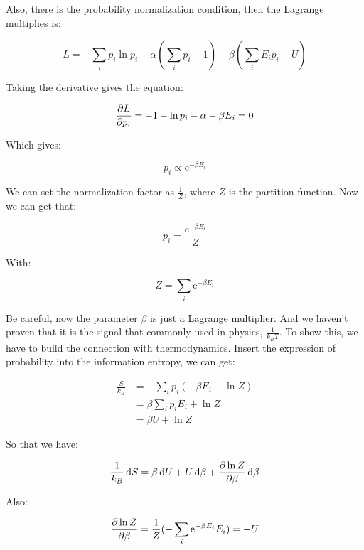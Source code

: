 \documentclass[../main.tex]{subfiles}
\begin{document}
Also, there is the probability normalization condition, then the Lagrange multiplies is:

\begin{equation}
    L = -\sum_{i} p_i \ln p_i - \alpha(\sum_{i} p_i - 1) - \beta(\sum_{i} E_i p_i - U)
\end{equation}

Taking the derivative gives the equation:

\begin{equation}
    \pdv{L}{p_i} = -1 - \ln p_i - \alpha - \beta E_i = 0
\end{equation}

Which gives:

\begin{equation}
    p_i \propto \textrm{e}^{-\beta E_i}
\end{equation}

We can set the normalization factor as $\frac{1}{Z}$, where $Z$ is the partition function. Now we can get that:

\begin{equation}
    p_i = \frac{\textrm{e}^{-\beta E_i}}{Z}
\end{equation}

With:

\begin{equation}
    Z = \sum_{i} \textrm{e}^{-\beta E_i}
\end{equation}

Be careful, now the parameter $\beta$ is just a Lagrange multiplier. And we haven't proven that it is the signal that commonly used in physics, $\frac{1}{k_B T}$. To show this, we have to build the connection with thermodynamics. Insert the expression of probability into the information entropy, we can get:

\begin{align}
    \frac{S}{k_B} &= -\sum_{i} p_i (-\beta E_i - \ln Z)\nonumber\\
    &= \beta \sum_{i} p_i E_i + \ln Z\nonumber\\
    &= \beta U + \ln Z
\end{align}

So that we have:

\begin{equation}
    \frac{1}{k_B}\dd{S} = \beta \dd{U} + U\dd{\beta} + \pdv{\ln Z}{\beta}\dd{\beta}
\end{equation}

Also:

\begin{align}
    \pdv{\ln Z}{\beta} = \frac{1}{Z}(-\sum_{i} \textrm{e}^{-\beta E_i} E_i) = -U
\end{align}
\end{document}
